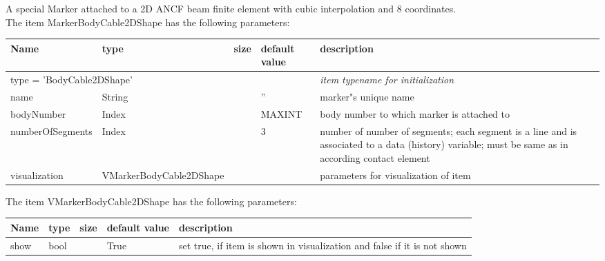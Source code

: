 A special Marker attached to a 2D ANCF beam finite element with cubic interpolation and 8 coordinates.
 \\The item MarkerBodyCable2DShape has the following parameters:
\begin{center}
  \footnotesize
  \begin{longtable}{| p{4.5cm} | p{2.5cm} | p{0.5cm} | p{2.5cm} | p{6cm} |}
    \hline
    \bf Name & \bf type & \bf size & \bf default value & \bf description \\ \hline
    \multicolumn{4}{l}{\parbox{10cm}{type = 'BodyCable2DShape'}} & \multicolumn{1}{l}{\parbox{6cm}{\it item typename for initialization}}\\ \hline
    name &     String &      &     '' &     marker"s unique name\\ \hline
    bodyNumber &     Index &      &     MAXINT &     body number to which marker is attached to\\ \hline
    numberOfSegments &     Index &      &     3 &     number of number of segments; each segment is a line and is associated to a data (history) variable; must be same as in according contact element\\ \hline
    visualization & VMarkerBodyCable2DShape & & & parameters for visualization of item \\ \hline
	  \end{longtable}
	\end{center}
The item VMarkerBodyCable2DShape has the following parameters:
\begin{center}
  \footnotesize
  \begin{longtable}{| p{4.5cm} | p{2.5cm} | p{0.5cm} | p{2.5cm} | p{6cm} |}
    \hline
    \bf Name & \bf type & \bf size & \bf default value & \bf description \\ \hline
    show &     bool &      &     True &     set true, if item is shown in visualization and false if it is not shown\\ \hline
	  \end{longtable}
	\end{center}

